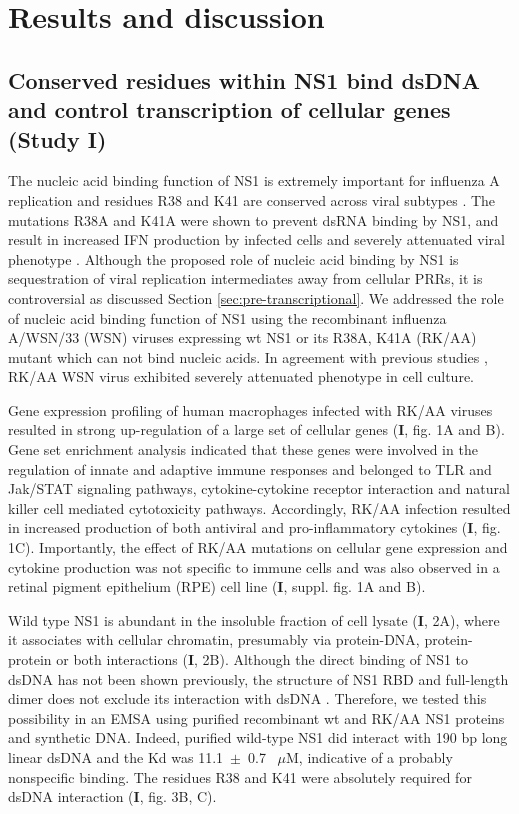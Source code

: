 
\clearpage
\section{Results and discussion}

	\subsection{Conserved residues within NS1 bind dsDNA and control transcription of cellular genes (Study I)}
	
		The nucleic acid binding function of NS1 is extremely important for influenza A replication and residues R38 and K41 are conserved across viral subtypes \parencite{Hatada1992, Zohari2008}. The mutations R38A and K41A were shown to prevent dsRNA binding by NS1, and result in increased IFN production by infected cells and severely attenuated viral phenotype \parencite{Donelan2003}. Although the proposed role of nucleic acid binding by NS1 is sequestration of viral replication intermediates away from cellular \gls{PRR}s, it is controversial as discussed Section \ref{sec:pre-transcriptional}. We addressed the role of nucleic acid binding function of NS1 using the recombinant influenza A/WSN/33 (WSN) viruses expressing \gls{wt} NS1 or its R38A, K41A (RK/AA) mutant which can not bind nucleic acids. In agreement with previous studies \parencite{Min2006}, RK/AA WSN virus exhibited severely attenuated phenotype in cell culture. 
		
		Gene expression profiling of human macrophages infected with RK/AA viruses resulted in strong up-regulation of a large set of cellular genes (\textbf{I}, fig. 1A and B). Gene set enrichment analysis \parencite{Subramanian2005} indicated that these genes were involved in the regulation of innate and adaptive immune responses and belonged to TLR and Jak/STAT signaling pathways, cytokine-cytokine receptor interaction and natural killer cell mediated cytotoxicity pathways. Accordingly, RK/AA infection resulted in increased production of both antiviral and pro-inflammatory cytokines (\textbf{I}, fig. 1C). Importantly, the effect of RK/AA mutations on cellular gene expression and cytokine production was not specific to immune cells and was also observed in a retinal pigment epithelium (RPE) cell line (\textbf{I}, suppl. fig. 1A and B). 
		
		Wild type NS1 is abundant in the insoluble fraction of cell lysate (\textbf{I}, 2A), where it associates with cellular chromatin, presumably via protein-DNA, protein-protein or both interactions (\textbf{I}, 2B). Although the direct binding of NS1 to dsDNA has not been shown previously, the structure of NS1 RBD and full-length dimer does not exclude its interaction with dsDNA \parencite{Bornholdt2008, Cheng2009}. Therefore, we tested this possibility in an \gls{EMSA} using purified recombinant \gls{wt} and RK/AA NS1 proteins and synthetic DNA. Indeed, purified wild-type NS1 did interact with 190 bp long linear dsDNA and the \gls{Kd} was 11.1~$\pm$~0.7~ $\mu$M, indicative of a probably nonspecific binding. The residues R38 and K41 were absolutely required for dsDNA interaction (\textbf{I}, fig. 3B, C). 
		
